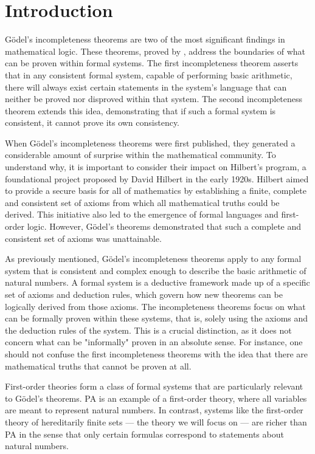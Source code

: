 \chapter*{Introduction}

Gödel’s incompleteness theorems are two of the most significant findings in mathematical logic. 
These theorems, proved by \cite{godel1931formal},
address the boundaries of what can be proven within formal systems. 
The first incompleteness theorem asserts that in any consistent formal system, 
capable of performing basic arithmetic, 
there will always exist certain statements in the system's language that can neither be proved
nor disproved within that system. 
The second incompleteness theorem extends this idea, 
demonstrating that if such a formal system is consistent, it cannot prove its own consistency.

When Gödel's incompleteness theorems were first published, 
they generated a considerable amount of surprise within the mathematical community. 
To understand why, it is important to consider their impact on Hilbert's program, 
a foundational project proposed by David Hilbert in the early 1920s. 
Hilbert aimed to provide a secure basis for all of mathematics by establishing a 
finite, complete and consistent set of axioms from which all mathematical truths could be derived. 
This initiative also led to the emergence of formal languages and first-order logic. 
However, Gödel's theorems demonstrated that such a complete and consistent set of axioms 
was unattainable.

As previously mentioned, Gödel's incompleteness theorems apply to any formal system 
that is consistent and complex enough to describe the basic arithmetic of natural numbers. 
A formal system is a deductive framework made up of a specific set of axioms and deduction rules, 
which govern how new theorems can be logically derived from those axioms.
The incompleteness theorems focus on what can be formally proven within these systems, that is,
solely using the axioms and the deduction rules of the system.
This is a crucial distinction, as it does not concern what can be "informally" proven
in an absolute sense.
For instance, one should not confuse the first incompleteness theorems with the idea that
there are mathematical truths that cannot be proven at all.

First-order theories form a class of formal systems that are particularly relevant to 
Gödel's theorems.
PA is an example of a first-order theory, 
where all variables are meant to represent natural numbers. 
In contrast, systems like the first-order theory of hereditarily finite sets — 
the theory we will focus on — are richer than PA in the sense that 
only certain formulas correspond to statements about natural numbers. 

